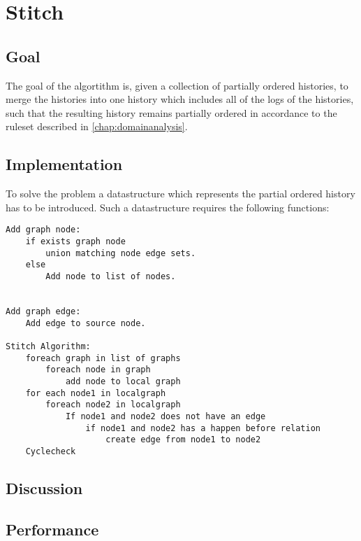 \section{Stitch}
\subsection{Goal} %
The goal of the algortithm is, given a collection of partially ordered histories, to merge the histories into one history which includes all of the logs of the histories, such that the resulting history remains partially ordered in accordance to the ruleset described in \ref{chap:domainanalysis}.


\subsection{Implementation} %
To solve the problem a datastructure which represents the partial ordered history has to be introduced. Such a datastructure requires the following functions:

\begin{lstlisting}[breaklines=true]
Add graph node:
    if exists graph node
        union matching node edge sets.
    else
        Add node to list of nodes.


Add graph edge:
	Add edge to source node.

Stitch Algorithm:
	foreach graph in list of graphs
		foreach node in graph
			add node to local graph
	for each node1 in localgraph
		foreach node2 in localgraph
			If node1 and node2 does not have an edge 
				if node1 and node2 has a happen before relation
					create edge from node1 to node2
	Cyclecheck
\end{lstlisting}

\subsection{Discussion} %
\subsection{Performance} %

